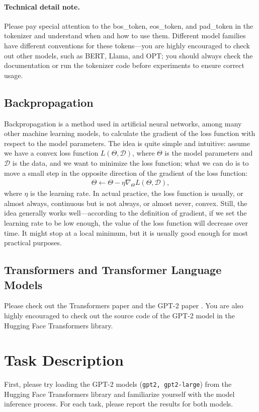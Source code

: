 \documentclass[12pt, letterpaper]{article}
\begin{document}
\paragraph{Technical detail note.}
Please pay special attention to the bos\_token, eos\_token, and pad\_token in the tokenizer and understand when and how to use them.
Different model families have different conventions for these tokens---you are highly encouraged to check out other models, such as BERT, Llama, and OPT; you should always check the documentation or run the tokenizer code before experiments to ensure correct usage.

\subsection{Backpropagation}
Backpropagation is a method used in artificial neural networks, among many other machine learning models, to calculate the gradient of the loss function with respect to the model parameters.
The idea is quite simple and intuitive: assume we have a convex loss function $L(\Theta, \mathcal{D})$, where $\Theta$ is the model parameters and $\mathcal{D}$ is the data, and we want to minimize the loss function; what we can do is to move a small step in the opposite direction of the gradient of the loss function:
\begin{align*}
    \Theta \leftarrow \Theta - \eta \nabla_\Theta L(\Theta, \mathcal{D}),
\end{align*}
where $\eta$ is the learning rate.
In actual practice, the loss function is usually, or almost always, continuous but is not always, or almost never, convex.
Still, the idea generally works well---according to the definition of gradient, if we set the learning rate to be low enough, the value of the loss function will decrease over time.
It might stop at a local minimum, but it is usually good enough for most practical purposes.

\subsection{Transformers and Transformer Language Models}
Please check out the Transformers paper \citep{vaswani-etal-2017-attention} and the GPT-2 paper \citep{radford-etal-2019-language}.
You are also highly encouraged to check out the source code of the GPT-2 model in the Hugging Face Transformers library.

\section{Task Description}
First, please try loading the GPT-2 models (\texttt{gpt2, gpt2-large}) from the Hugging Face Transformers library and familiarize yourself with the model inference process.
For each task, please report the results for both models.
\end{document}
